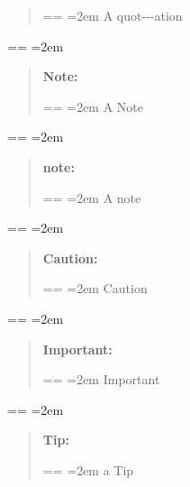 \documentclass{book}
\makeatletter
\newenvironment{GNUTexinfopreformatted}{%
  \par\obeylines\obeyspaces\frenchspacing
  \parskip=\z@\parindent=\z@}{}
\makeatother
\begin{document}
\begin{quote}
\begin{GNUTexinfopreformatted}
\leftskip=2em\relax\ttfamily%
A quot{-}{-}{-}ation
\end{GNUTexinfopreformatted}
\end{quote}
\begin{GNUTexinfopreformatted}
\leftskip=2em\relax\ttfamily%

\end{GNUTexinfopreformatted}
\begin{quote}
\textbf{Note:} \begin{GNUTexinfopreformatted}
\leftskip=2em\relax\ttfamily%
A Note
\end{GNUTexinfopreformatted}
\end{quote}
\begin{GNUTexinfopreformatted}
\leftskip=2em\relax\ttfamily%

\end{GNUTexinfopreformatted}
\begin{quote}
\textbf{note:} \begin{GNUTexinfopreformatted}
\leftskip=2em\relax\ttfamily%
A note
\end{GNUTexinfopreformatted}
\end{quote}
\begin{GNUTexinfopreformatted}
\leftskip=2em\relax\ttfamily%

\end{GNUTexinfopreformatted}
\begin{quote}
\textbf{Caution:} \begin{GNUTexinfopreformatted}
\leftskip=2em\relax\ttfamily%
Caution
\end{GNUTexinfopreformatted}
\end{quote}
\begin{GNUTexinfopreformatted}
\leftskip=2em\relax\ttfamily%

\end{GNUTexinfopreformatted}
\begin{quote}
\textbf{Important:} \begin{GNUTexinfopreformatted}
\leftskip=2em\relax\ttfamily%
Important
\end{GNUTexinfopreformatted}
\end{quote}
\begin{GNUTexinfopreformatted}
\leftskip=2em\relax\ttfamily%

\end{GNUTexinfopreformatted}
\begin{quote}
\textbf{Tip:} \begin{GNUTexinfopreformatted}
\leftskip=2em\relax\ttfamily%
a Tip
\end{GNUTexinfopreformatted}
\end{quote}
\end{document}
